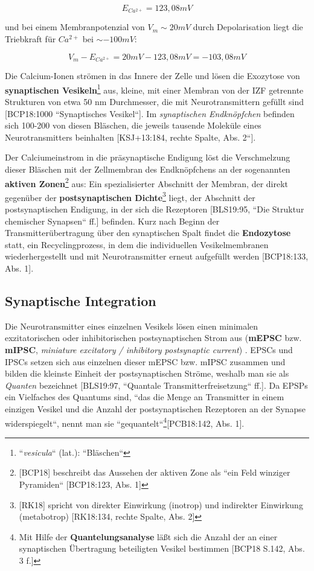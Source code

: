 {{\begin{equation}
 E_{Ca^{2+}} = 123,08 mV
 \label{eq:gl-eqca2}
\end{equation}



\pagebreak

und bei einem Membranpotenzial von $V_m \sim 20 mV$ durch Depolarisation liegt die Triebkraft für $Ca^{2+}$ bei $\sim -100 mV$:

\begin{equation}
 V_m - E_{Ca^{2+}} = 20 mV - 123,08 mV = -103,08 mV
 \label{eq:gl-triebkraftca2}
\end{equation}


Die Calcium-Ionen strömen in das Innere der Zelle und lösen die Exozytose von \textbf{synaptischen Vesikeln}\footnote{
 ``\textit{vesicula}`` (lat.): ``Bläschen``
} aus, kleine, mit einer Membran von der IZF getrennte Strukturen von etwa 50 nm Durchmesser, die mit Neurotransmittern gefüllt sind [BCP18:1000 ``Synaptisches Vesikel``].
Im \textit{synaptischen Endknöpfchen} befinden sich 100-200 von diesen Bläschen, die jeweils tausende Moleküle eines Neurotransmitters beinhalten [KSJ+13:184, rechte Spalte, Abs. 2``].

Der Calciumeinstrom in die präsynaptische Endigung löst die Verschmelzung dieser Bläschen mit der Zellmembran des Endknöpfchens an der sogenannten \textbf{aktiven Zonen}\footnote{
 [BCP18] beschreibt das Aussehen der aktiven Zone als ``ein Feld winziger Pyramiden`` [BCP18:123, Abs. 1]
} aus: Ein spezialisierter Abschnitt der Membran, der direkt gegenüber der \textbf{postsynaptischen Dichte}\footnote{
 [RK18] spricht von direkter Einwirkung (inotrop) und indirekter Einwirkung (metabotrop) [RK18:134, rechte Spalte, Abs. 2]
} liegt, der Abschnitt der postsynaptischen Endigung, in der sich die Rezeptoren [BLS19:95, ``Die Struktur chemischer Synapsen`` ff.] befinden.
Kurz nach Beginn der Transmitterübertragung über den synaptischen Spalt findet die \textbf{Endozytose} statt, ein Recyclingprozess, in dem die individuellen Vesikelmembranen wiederhergestellt und mit Neurotransmitter erneut aufgefüllt werden [BCP18:133, Abs. 1].


\subsection{Synaptische Integration}

Die Neurotransmitter eines einzelnen Vesikels lösen einen minimalen exzitatorischen oder inhibitorischen postsynaptischen Strom aus (\textbf{mEPSC} bzw. \textbf{mIPSC}, \textit{miniature excitatory / inhibitory postsynaptic current}) . 
EPSCs und IPSCs setzen sich aus einzelnen dieser mEPSC bzw. mIPSC zusammen und bilden die kleinste Einheit der postsynaptischen Ströme, weshalb man sie als \textit{Quanten} bezeichnet [BLS19:97, ``Quantale Transmitterfreisetzung`` ff.]. 
Da EPSPs ein Vielfaches des Quantums sind, ``das die Menge an Transmitter in einem einzigen Vesikel und die Anzahl der postsynaptischen Rezeptoren an der Synapse widerspiegelt``, nennt man sie ``gequantelt``\footnote{
 Mit Hilfe der \textbf{Quantelungsanalyse} läßt sich die Anzahl der an einer synaptischen Übertragung beteiligten Vesikel bestimmen [BCP18 S.142, Abs. 3 f.]
}[PCB18:142, Abs. 1].

}}
